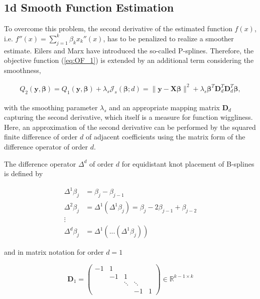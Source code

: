 \documentclass[10pt,a4paper]{article}
\begin{document}
	\subsection{1d Smooth Function Estimation} \label{1D_smooth}

	To overcome this problem, the second derivative of the estimated function $f(x)$, i.e. $f''(x) = \sum_{j=1}^k \beta_k x_k''(x)$, has to be penalized to realize a smoother estimate. Eilers and Marx have introduced the so-called P-splines. \cite{eilers1996flexible} Therefore, the objective function (\ref{eq:OF_1}) is extended by an additional term considering the smoothness, 
	
	\begin{align}\label{eq:OF_2}
		Q_2(\boldsymbol{y}, \boldsymbol{\beta}) = Q_1(\boldsymbol{y}, \boldsymbol{\beta}) + \lambda_s \mathcal{J}_s(\boldsymbol{\beta}; d) = \lVert \boldsymbol{y} - \boldsymbol{X} \boldsymbol{\beta} \rVert^2 + \lambda_s \boldsymbol{\beta}^T \boldsymbol{D}_d^T \boldsymbol{D}_d^T \boldsymbol{\beta}, 
	\end{align}
	
	with the smoothing parameter $\lambda_s$ and an appropriate mapping matrix $\boldsymbol{D}_d$ capturing the second derivative, which itself is a measure for function wiggliness. Here, an approximation of the second derivative can be performed by the squared finite difference of order $d$ of adjacent coefficients using the matrix form of the difference operator of order $d$. 
	
	The difference operator  $\Delta^d$ of order $d$ for equidistant knot placement of B-splines is defined by
	
	\begin{align*}
		\Delta^1 \beta_j &= \beta_j - \beta_{j-1} \\
		\Delta^2 \beta_j &= \Delta^1(\Delta^1 \beta_j) = \beta_j - 2\beta_{j-1} + \beta_{j-2} \\ 
	  	\vdots \\ 
	  	\Delta^d \beta_j &= \Delta^1(...(\Delta^1 \beta_j))
	\end{align*}
	
	and in matrix notation for order $d=1$
	
	$$\boldsymbol{D}_1 = 
			\begin{pmatrix} 
					-1& 1&       &        &   \\  
					  &-1& 1     &        &   \\  
					  &  &\ddots & \ddots &   \\ 
					  &  &       & -1     & 1 
			\end{pmatrix} \in \mathbb R^{k-1\times k}$$
	
\end{document}

